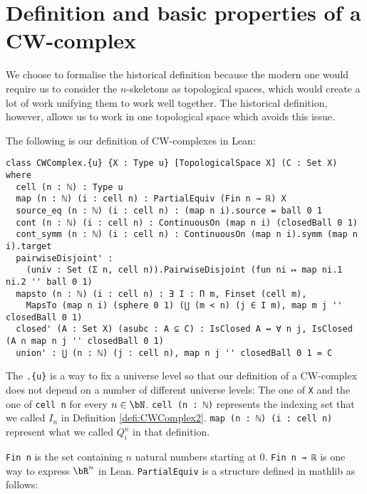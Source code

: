 \section{Definition and basic properties of a CW-complex}

We choose to formalise the historical definition because the modern one would require us to consider the $n$-skeletons as topological spaces, which would create a lot of work unifying them to work well together. 
The historical definition, however, allows us to work in one topological space which avoids this issue.  

The following is our definition of CW-complexes in Lean: 
\href{https://github.com/scholzhannah/CWComplexes/blob/7be4872a05b534011cc969eb5b80a4b7f0bf57e2/CWcomplexes/Definition.lean#L47-L76}{\faExternalLink}

\begin{lstlisting}
class CWComplex.{u} {X : Type u} [TopologicalSpace X] (C : Set X) where
  cell (n : ℕ) : Type u
  map (n : ℕ) (i : cell n) : PartialEquiv (Fin n → ℝ) X
  source_eq (n : ℕ) (i : cell n) : (map n i).source = ball 0 1
  cont (n : ℕ) (i : cell n) : ContinuousOn (map n i) (closedBall 0 1)
  cont_symm (n : ℕ) (i : cell n) : ContinuousOn (map n i).symm (map n i).target
  pairwiseDisjoint' :
    (univ : Set (Σ n, cell n)).PairwiseDisjoint (fun ni ↦ map ni.1 ni.2 '' ball 0 1)
  mapsto (n : ℕ) (i : cell n) : ∃ I : Π m, Finset (cell m),
    MapsTo (map n i) (sphere 0 1) (⋃ (m < n) (j ∈ I m), map m j '' closedBall 0 1)
  closed' (A : Set X) (asubc : A ⊆ C) : IsClosed A ↔ ∀ n j, IsClosed (A ∩ map n j '' closedBall 0 1)
  union' : ⋃ (n : ℕ) (j : cell n), map n j '' closedBall 0 1 = C
\end{lstlisting}

The \lstinline|.{u}| is a way to fix a universe level so that our definition of a CW-complex does not depend on a number of different universe levels: The one of \lstinline{X} and the one of \lstinline{cell n} for every $n \in \bN$.
\lstinline{cell (n : ℕ)} represents the indexing set that we called $I_n$ in Definition \ref{defi:CWComplex2}. \lstinline{map (n : ℕ) (i : cell n)} represent what we called $Q_i^n$ in that definition.

\lstinline{Fin n}
\href{https://github.com/leanprover/lean4/blob/0edf1bac392f7e2fe0266b28b51c498306363a84/src/Init/Prelude.lean#L1826-L1838}{\faExternalLink} 
is the set containing $n$ natural numbers starting at 0.
\lstinline{Fin n → ℝ} is one way to express $\bR^n$ in Lean.
\lstinline{PartialEquiv} is a structure defined in mathlib as follows: 
\href{https://github.com/leanprover-community/mathlib4/blob/ed125a4216d18273cb1b96d4c846d32b85d74faf/Mathlib/Logic/Equiv/PartialEquiv.lean#L113-L134}{\faExternalLink}

